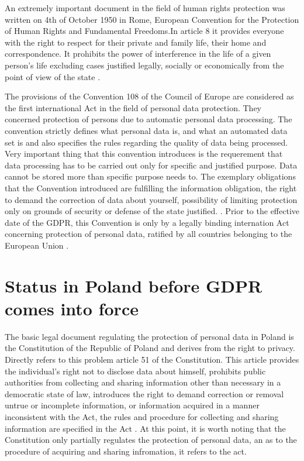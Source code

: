 \documentclass[en, noamssymb]{mgr}
\begin{document}
\indent An extremely important document in the field of human rights protection was written on 4th of October 1950 in Rome, European Convention for the Protection of Human Rights and Fundamental Freedoms.In article 8 it provides everyone with the right to respect for their private and family life, their home and correspondence. It prohibits the power of interference in the life of a given person's life excluding cases justified legally, socially or economically from the point of view of the state \cite{prawo_odo}.

\indent The provisions of the Convention 108 of the Council of Europe are considered as the first international Act in the field of personal data protection. They concerned protection of persons due to automatic personal data processing. The convention strictly defines what personal data is, and what an automated data set is and also specifies the rules regarding the quality of data being processed. Very important thing that this convention introduces is the requerement that data processing has to be carried out only for specific and justified purpose. Data cannot be stored more than specific purpose needs to. The exemplary obligations that the Convention introduced are fulfilling the information obligation, the right to demand the correction of data about yourself, possibility of limiting protection only on grounds of security or defense of the state justified. \cite{prawo_odo}. Prior to the effective date of the GDPR, this Convention is only by a legally binding internation Act concerning protection of personal data, ratified by all countries belonging to the European Union \cite{prawo_odo}.



\section{Status in Poland before GDPR comes into force}

The basic legal document regulating the protection of personal data in Poland is the Constitution of the Republic of Poland and derives from the right to privacy. Directly refers to this problem article 51 of the Constitution. This article provides the individual's right not to disclose data about himself, prohibits public authorities from collecting and sharing information other than necessary in a democratic state of law, introduces the right to demand correction or removal untrue or incomplete information, or information acquired in a manner inconsistent with the Act, the rules and procedure for collecting and sharing information are specified in the Act \cite{konstytucja_art51}. At this point, it is worth noting that the Constitution only partially regulates the protection of personal data, an as to the procedure of acquiring and sharing infromation, it refers to the act. 
\end{document}
